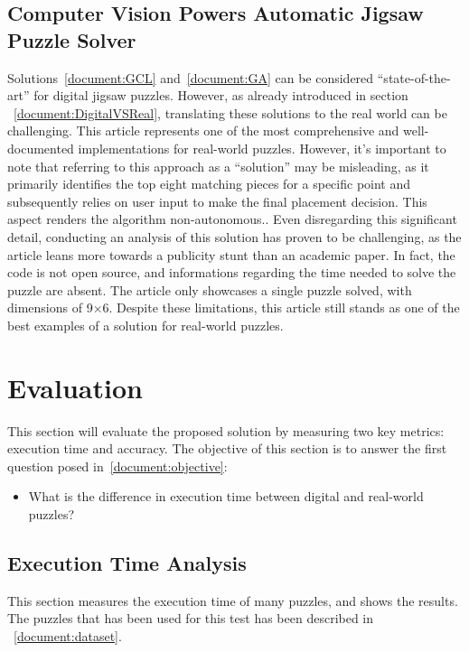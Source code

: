 \documentclass{article}
\begin{document}
\subsection{Computer Vision Powers Automatic Jigsaw Puzzle Solver~\cite{Abto}}
Solutions~\cref{document:GCL} and~\cref{document:GA} can be considered ``state-of-the-art''
for digital jigsaw puzzles.
However, as already introduced in section ~\cref{document:DigitalVSReal},
translating these solutions to the real world can be challenging.\newline
This article represents one of the most comprehensive and well-documented
implementations for real-world puzzles. However,
it's important to note that referring to this approach as a ``solution''
may be misleading, as it primarily identifies the top eight matching
pieces for a specific point and subsequently relies on user input to make
the final placement decision.
This aspect renders the algorithm non-autonomous..\newline
Even disregarding this significant detail,
conducting an analysis of this solution has proven to be challenging,
as the article leans more towards a publicity stunt than an academic paper.
In fact, the code is not open source, and informations regarding the time needed
to solve the puzzle are absent. The article only showcases a single puzzle solved,
with dimensions of 9\(\times\)6.\newline
Despite these limitations, this article still stands as one of the best examples of a solution
for real-world puzzles.



\section{Evaluation}
This section will evaluate the proposed solution by measuring
two key metrics: execution time and accuracy. 
The objective of this section is to answer the first question posed in~\cref{document:objective}:
\begin{itemize}
  \item What is the difference in execution time between
                digital and real-world puzzles?
\end{itemize}

\subsection{Execution Time Analysis}

This section measures the execution time of many puzzles,
and shows the results. The puzzles that has been used for
this test has been described in ~\cref{document:dataset}.
\end{document}
